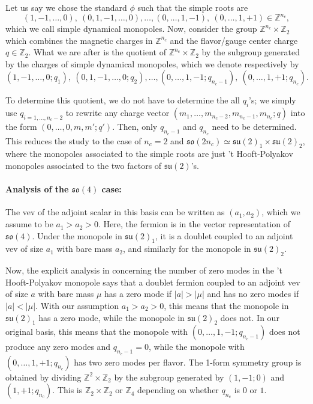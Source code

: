 \documentclass[12pt]{article}
\numberwithin{equation}{section}
\def\bZ{\mathbb{Z}}
\def\su{\mathfrak{su}}
\def\so{\mathfrak{so}}
\begin{document}
Let us say we chose the standard $\phi$ such that the simple roots are 
\begin{equation}
(1,-1,\ldots,0),\ 
(0,1,-1,\ldots,0),\ldots,
(0,\ldots,1,-1),\ 
(0,\ldots,1,+1)\in \bZ^{n_c},
\end{equation}
which we call simple dynamical monopoles.
Now, consider the group $\bZ^{n_c}\times \bZ_2$ which combines the magnetic charges in $\bZ^{n_c}$ and the flavor/gauge center charge $q \in \bZ_2$.
What we are after is the quotient of $\bZ^{n_c}\times \bZ_2$ 
by the subgroup generated by the charges of simple dynamical monopoles,
which we denote respectively by
\begin{equation}
(1,-1,\ldots,0;q_1),\ 
(0,1,-1,\ldots,0;q_2),\ldots,
(0,\ldots,1,-1;q_{n_c-1}),\ 
(0,\ldots,1,+1;q_{n_c}).
\end{equation}

To determine this quotient,
we do not have to determine the all $q_i$'s; 
we simply use $q_{i=1,\ldots, n_c-2}$ to rewrite any charge vector $
(m_1,\ldots, m_{n_c-2}, m_{n_c-1},m_{n_c}; q)
$
into the form $
(0,\ldots,0, m, m' ; q').
$
Then, only $q_{n_c-1}$ and $q_{n_c}$ need to be determined.
This reduces the study to the case of $n_c=2$ and $\so(2n_c)\simeq \su(2)_1 \times \su(2)_2$,
where the monopoles associated to the simple roots are just 't Hooft-Polyakov monopoles associated to the two factors of $\su(2)$'s.

\paragraph{Analysis of the $\so(4)$ case:}

The vev of the adjoint scalar in this basis can be written as $(a_1,a_2)$, which we assume to be $a_1>a_2>0$.
Here, the fermion is in the vector representation of $\so(4)$.
Under the monopole in $\su(2)_1$, it is a doublet coupled to an adjoint vev of size $a_1$ with bare mass $a_2$,
and similarly for the monopole in $\su(2)_2$.

Now, the explicit analysis in \cite[Sec.~IV]{Callias:1977kg} concerning the number of zero modes in the 't Hooft-Polyakov monopole says that 
a doublet fermion coupled to an adjoint vev of size $a$ with bare mass $\mu$ has
a zero mode if $|a|>|\mu|$ and 
has no zero modes if $|a|<|\mu|$.
With our assumption $a_1>a_2>0$, this means that the monopole in $\su(2)_1$ has a zero mode, while the monopole in $\su(2)_2$ does not.
In our original basis, this means that the monopole with $(0,\ldots,1,-1;q_{n_c-1})$ does not produce any zero modes and $q_{n_c-1}=0$,
while the monopole with $(0,\ldots,1,+1;q_{n_c})$  has two zero modes per flavor.
The 1-form symmetry group is obtained by dividing $\bZ^2\times \bZ_2$ by the subgroup generated by $(1,-1;0)$ and $(1,+1;q_{n_c})$.
This is $\bZ_2\times \bZ_2$ or $\bZ_4$ depending on whether $q_{n_c}$ is $0$ or $1$.
\end{document}
